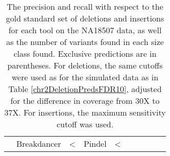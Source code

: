 \begin{table}
\begin{center}
\begin{tabular}{r|rrrr|rrrrr}
& Breakdancer & <%
&  Pindel & <%
\hline
\end{tabular}
\end{center}
\caption{The precision and recall with respect to the gold standard set of deletions and insertions for each tool on the NA18507 data, as well as the number of variants found in each size class found. Exclusive predictions are in parentheses. For deletions, the same cutoffs were used as for the simulated data as in Table \ref{chr2DeletionPredsFDR10}, adjusted for the difference in coverage from 30X to 37X. For insertions, the maximum sensitivity cutoff was used.}
\label{NA18507DeletionAndInsertionPreds}
\end{table}
